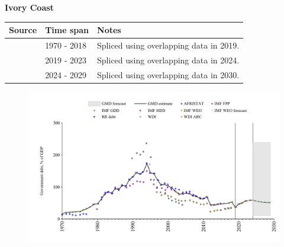 \documentclass[12pt,a4paper,landscape]{article}
\begin{document}
\begin{adjustbox}{max totalsize={\paperwidth}{\paperheight},center}
\begin{minipage}[t][\textheight][t]{\textwidth}
\vspace*{0.5cm}
{}
\begin{center}
{\Large\bfseries Ivory Coast}
\end{center}
\vspace{0.5cm}
\begin{table}[H]
\centering
\small
\begin{tabular}{|l|l|l|}
\hline
\textbf{Source} & \textbf{Time span} & \textbf{Notes} \\
\hline
\rowcolor{white}\cite{IMF_GDD}& 1970 - 2018 &Spliced using overlapping data in 2019.\\
\rowcolor{lightgray}\cite{IMF_FPP}& 2019 - 2023 &Spliced using overlapping data in 2024.\\
\rowcolor{white}\cite{IMF_WEO_forecast}& 2024 - 2029 &Spliced using overlapping data in 2030.\\
\hline
\end{tabular}
\end{table}
\begin{figure}[H]
\centering
\includegraphics[width=\textwidth,height=0.6\textheight,keepaspectratio]{graphs/CIV_govdebt_GDP.pdf}
\end{figure}
\end{minipage}
\end{adjustbox}
\end{document}
